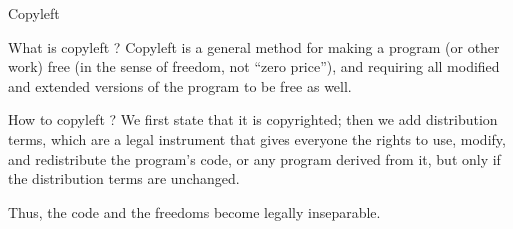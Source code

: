 \documentclass{beamer}
\begin{document}
\begin{frame}[plain]%
%  
\end{frame}

\begin{frame}{Copyleft}

  \begin{block}{What is copyleft ?}
    Copyleft is a general method for making a program (or other work)
    free (in the sense of freedom, not “zero price”), and requiring
    all modified and extended versions of the program to be free as
    well.
  \end{block}

  \begin{block}{How to copyleft ?}
    We first state that it is copyrighted; then we add distribution
    terms, which are a legal instrument that gives everyone the rights
    to use, modify, and redistribute the program's code, or any
    program derived from it, but only if the distribution terms are
    unchanged.

    Thus, the code and the freedoms become legally inseparable.
  \end{block}

    
\end{frame}
\end{document}
